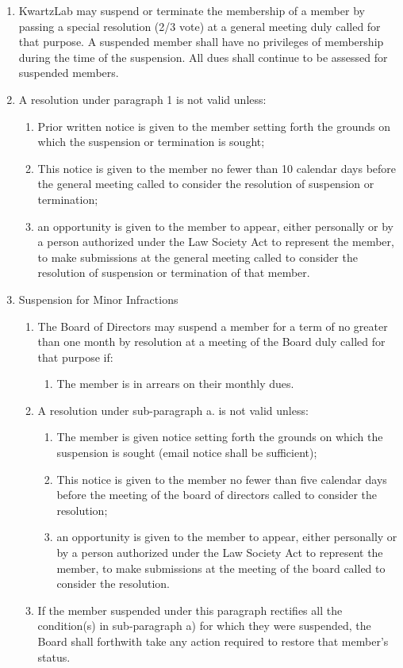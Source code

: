 \documentclass{article}
\begin{document}
\begin{enumerate}
\item KwartzLab may suspend or terminate the membership of a member by passing a special resolution (2/3 vote) at a general meeting duly called for that purpose. A suspended member shall have no privileges of membership during the time of the suspension. All dues shall continue to be assessed for suspended members.
\item A resolution under paragraph 1 is not valid unless:
	\begin{enumerate}
	\item Prior written notice is given to the member setting forth the grounds on which the suspension or termination is sought;
	\item This notice is given to the member no fewer than 10 calendar days before the general meeting called to consider the resolution of suspension or termination;
	\item an opportunity is given to the member to appear, either personally or by a person authorized under the Law Society Act to represent the member, to make submissions at the general meeting called to consider the resolution of suspension or termination of that member.
	\end{enumerate}
\item Suspension for Minor Infractions
	\begin{enumerate}
	\item The Board of Directors may suspend a member for a term of no greater than one month by resolution at a meeting of the Board duly called for that purpose if:
		\begin{enumerate}
		\item The member is in arrears on their monthly dues.
		\end{enumerate}
	\item A resolution under sub-paragraph a. is not valid unless:
		\begin{enumerate}
		\item The member is given notice setting forth the grounds on which the suspension is sought (email notice shall be sufficient);
		\item This notice is given to the member no fewer than five calendar days before the meeting of the board of directors called to consider the resolution;
		\item an opportunity is given to the member to appear, either personally or by a person authorized under the Law Society Act to represent the member, to make submissions at the meeting of the board called to consider the resolution.
		\end{enumerate}
	\item If the member suspended under this paragraph rectifies all the condition(s) in sub-paragraph a) for which they were suspended, the Board shall forthwith take any action required to restore that member’s status.
	\end{enumerate}
\end{enumerate}
\end{document}
